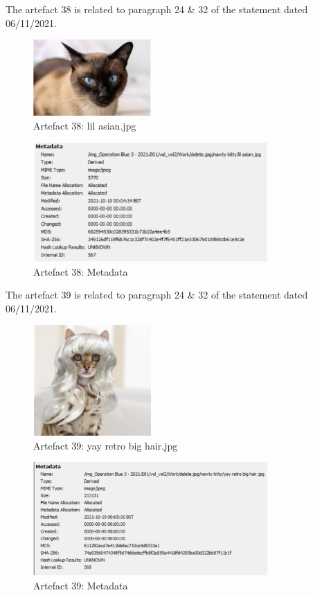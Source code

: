 The artefact 38 is related to paragraph 24 \& 32 of the statement
dated 06/11/2021.
\begin{figure}[H]
  \centering
  \includegraphics[width=0.4\textwidth]{figures/artefact38}
  \caption{Artefact 38: lil asian.jpg}
  \label{f:artefact38}
\end{figure}
\begin{figure}[H]
  \centering
  \includegraphics[width=0.8\textwidth]{figures/meta38}
  \caption{Artefact 38: Metadata}
  \label{f:meta38}
\end{figure}
The artefact 39 is related to paragraph 24 \& 32 of the statement
dated 06/11/2021.
\begin{figure}[H]
  \centering
  \includegraphics[width=0.4\textwidth]{figures/artefact39}
  \caption{Artefact 39: yay retro big hair.jpg}
  \label{f:artefact39}
\end{figure}
\begin{figure}[H]
  \centering
  \includegraphics[width=0.8\textwidth]{figures/meta39}
  \caption{Artefact 39: Metadata}
  \label{f:meta39}
\end{figure}

